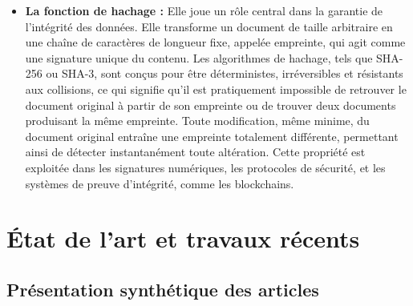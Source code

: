 \documentclass[11pt]{article}
\begin{document}
\begin{itemize}
\begin{itemize}
        \item \textbf{La fonction de hachage : }
        Elle joue un rôle central dans la garantie de l’intégrité des données. Elle transforme un document de taille arbitraire en une chaîne de caractères de longueur fixe, appelée empreinte, qui agit comme une signature unique du contenu. Les algorithmes de hachage, tels que SHA-256 ou SHA-3, sont conçus pour être déterministes, irréversibles et résistants aux collisions, ce qui signifie qu’il est pratiquement impossible de retrouver le document original à partir de son empreinte ou de trouver deux documents produisant la même empreinte. Toute modification, même minime, du document original entraîne une empreinte totalement différente, permettant ainsi de détecter instantanément toute altération. Cette propriété est exploitée dans les signatures numériques, les protocoles de sécurité, et les systèmes de preuve d’intégrité, comme les blockchains.
        
        
    \end{itemize}

\end{itemize}

\newpage

\section{État de l'art et travaux récents}



\subsection{ Présentation synthétique des articles}
\end{document}
